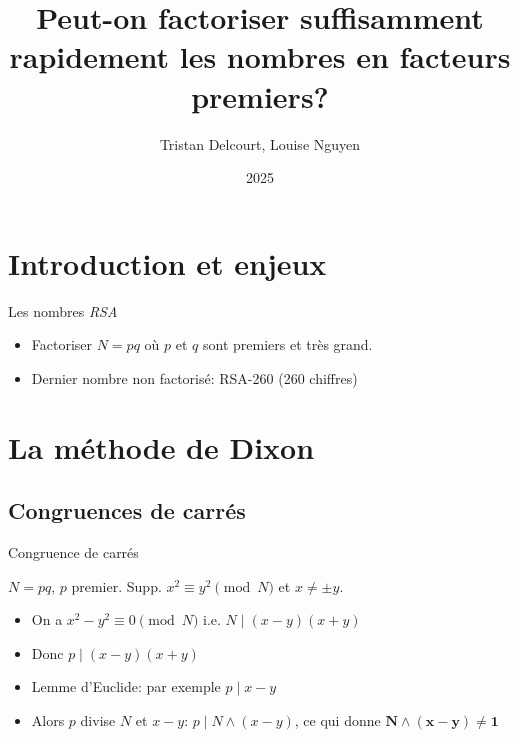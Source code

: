 \documentclass{beamer}
\title{Peut-on factoriser suffisamment rapidement les nombres en facteurs premiers?}
\author{Tristan Delcourt, Louise Nguyen}
\date{2025}
\begin{document}
\begin{frame}[plain]
    \titlepage
\end{frame}

\section{Introduction et enjeux}
\begin{frame}{Les nombres \textit{RSA}}

\begin{itemize}
    \item Factoriser $N = pq$ où $p$ et $q$ sont premiers et très grand.
    \item Dernier nombre non factorisé: RSA-260 (260 chiffres)
\end{itemize}

\end{frame}

\section{La méthode de Dixon}
\subsection{Congruences de carrés}
\begin{frame}{Congruence de carrés}

$N = pq$, $p$ premier. Supp. $x^2 \equiv y^2 \pmod N$ et $x\neq\pm y$.
\pause
\begin{itemize}[<+->]
\item On a $x^2 - y^2 \equiv 0 \pmod N$ i.e. $N \mid (x-y)(x+y)$
\item Donc $p \mid (x-y)(x+y)$
\item Lemme d'Euclide: par exemple $p \mid x-y$
\item Alors $p$ divise $N$ et $x-y$: $p \mid N \land (x-y)$, ce qui donne $\mathbf{N \land(x-y)\neq1}$
\end{itemize}

    
\end{frame}
\end{document}
